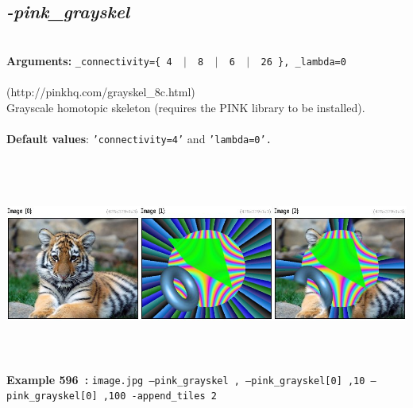 \documentclass[a4paper,11pt,twoside]{book}
\begin{document}
\subsection{\emph{-pink\_grayskel} }\vspace*{-0.5em}
~\\\textbf{Arguments: } 
{\small \texttt{\_connectivity=\{ 4 ~$|$~ 8 ~$|$~ 6 ~$|$~ 26 \}, \_lambda=0}}\\~\\
(http://pinkhq.com/grayskel\_8c.html)
~\\Grayscale homotopic skeleton (requires the PINK library to be installed).
~\\~\\\textbf{Default values}: {\small \texttt{'connectivity=4'} and \texttt{'lambda=0'.}}
\begin{center}\includegraphics[keepaspectratio=true,height=7cm,width=\textwidth]{img/gmic_def596.jpg}\\
{\footnotesize \textbf{Example 596~:} \texttt{image.jpg --pink\_grayskel , --pink\_grayskel[0] ,10 --pink\_grayskel[0] ,100 -append\_tiles 2}}
\end{center}
\end{document}
